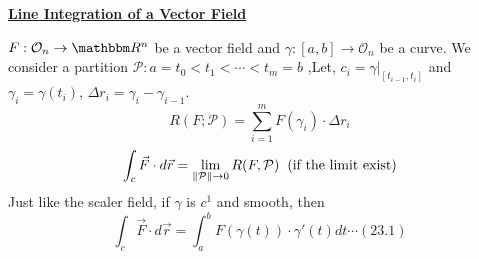 \documentclass[Analysis-3]{subfiles}
\begin{document}
\begin{center}
    \large \underline{\textbf{Line Integration of a Vector Field} }
\end{center}

$F:\mathcal{O}_n \to \R^n$ be a vector field and $\gamma:[a,b] \to \mathcal{O}_n$ be a curve. We consider a partition $\mathcal{P}: a =t_0<t_1<\cdots < t_m=b$ ,Let, $c_i = \gamma|_{[t_{i-1},t_i]}$ and $\gamma_i = \gamma(t_i)$, $\Delta r_i = \gamma_{i} - \gamma_{i-1}$.
\[R(F;\mathcal{P})= \sum_{i=1}^m F(\gamma_i)\cdot \Delta r_i\]
\[\int_c \vec{F}\cdot d\vec{r} = \lim_{\norm{\mathcal{P}}\to 0} R(F,\mathcal{P}) \hspace{0.2cm}(\text{if the limit exist})\]
Just like the scaler field, if $\gamma$ is $c^1$ and smooth, then 
\[\int_c \vec{F}\cdot d\vec{r} = \int_a^b F(\gamma(t))\cdot \gamma'(t) dt \label{eq:3} \cdots (23.1)\]
\end{document}
